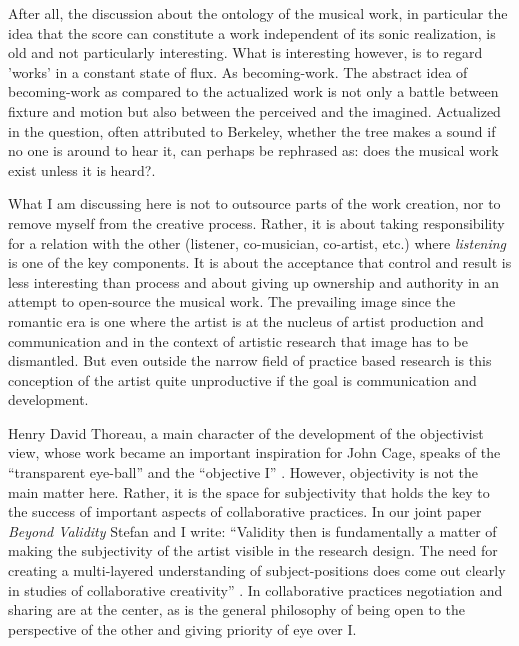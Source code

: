 \documentclass{article}
\begin{document}
After all, the discussion about the ontology of the musical work, in particular the idea that the score can constitute a work independent of its sonic realization, is old and not particularly interesting. What is interesting however, is to regard 'works' in a constant state of flux. As becoming-work. The abstract idea of becoming-work as compared to the actualized work is not only a battle between fixture and motion but also between the perceived and the imagined. Actualized in the question, often attributed to Berkeley, whether the tree makes a sound if no one is around to hear it, can perhaps be rephrased as: does the musical work exist unless it is heard?.

What I am discussing here is not to outsource parts of the work creation, nor to remove myself from the creative process. Rather, it is about taking responsibility for a relation with the other (listener, co-musician, co-artist, etc.) where \emph{listening} is one of the key components. It is about the acceptance that control and result is less interesting than process and about giving up ownership and authority in an attempt to open-source the musical work. The prevailing image since the romantic era is one where the artist is at the nucleus of artist production and communication and in the context of artistic research that image has to be dismantled. But even outside the narrow field of practice based research is this conception of the artist quite unproductive if the goal is communication and development. 

Henry David Thoreau, a main character of the development of the objectivist view, whose work became an important inspiration for John Cage, speaks of the ``transparent eye-ball'' and the ``objective I'' \citep{thoreau2004}. However, objectivity is not the main matter here. Rather, it is the space for subjectivity that holds the key to the success of important aspects of collaborative practices. In our joint paper \emph{Beyond Validity} Stefan and I write: ``Validity then is fundamentally a matter of making the subjectivity of the artist visible in the research design. The need for creating a multi-layered understanding of subject-positions does come out clearly in studies of collaborative creativity'' \citep{frisk-ost13}. In collaborative practices negotiation and sharing are at the center, as is the general philosophy of being open to the perspective of the other and giving priority of eye over I. 
\end{document}
